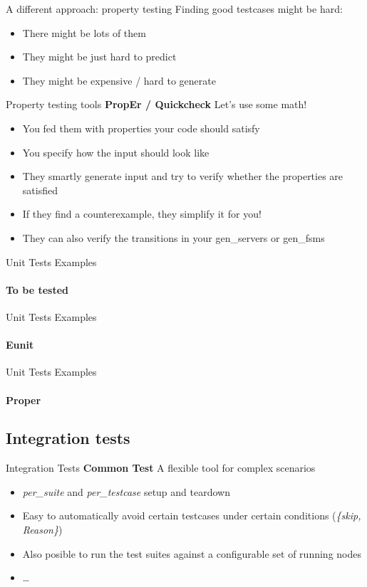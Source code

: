 \documentclass[aspectratio=169]{beamer}
\begin{document}
\begin{frame}{A different approach: property testing}
    Finding good testcases might be hard:
    \begin{itemize}
    \item There might be lots of them
    \item They might be just hard to predict
    \item They might be expensive / hard to generate
    \end{itemize}
\end{frame}

\begin{frame}{Property testing tools}
    \textbf{PropEr / Quickcheck} Let's use some math!
    \begin{itemize}
    \pause
    \item You fed them with properties your code should satisfy
    \pause
    \item You specify how the input should look like
    \pause
    \item They smartly generate input and try to verify whether the properties are satisfied
    \pause
    \item If they find a counterexample, they simplify it for you!
    \pause
    \item They can also verify the transitions in your gen\_servers or gen\_fsms
    \end{itemize}
\end{frame}

\begin{frame}{Unit Tests Examples}
    \framesubtitle{To be tested}
    
\end{frame}

\begin{frame}{Unit Tests Examples}
    \framesubtitle{Eunit}
    
\end{frame}

\begin{frame}{Unit Tests Examples}
    \framesubtitle{Proper}
    
\end{frame}

\subsection*{Integration tests}
\label{integration_tests}
\begin{frame}{Integration Tests}
    \textbf{Common Test} A flexible tool for complex scenarios
    \begin{itemize}
    \pause
    \item \emph{per\_suite} and \emph{per\_testcase} setup and teardown
    \pause
    \item Easy to automatically avoid certain testcases under certain conditions (\emph{\{skip, Reason\}})
    \pause
    \item Also posible to run the test suites against a configurable set of running nodes
    \pause
    \item \dots
    \end{itemize}
\end{frame}
\end{document}
